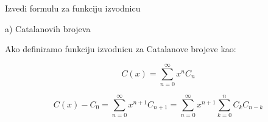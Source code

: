 \documentclass[exam.tex]{subfiles}
\begin{document}
	Izvedi formulu za funkciju izvodnicu
	
	a) Catalanovih brojeva
	
	Ako definiramo funkciju izvodnicu za Catalanove brojeve kao:
	
	\[ C(x) = \sum\limits^\infty_{n=0} x^n C_n \]
	
	\[ C(x) - C_0 = \sum\limits^\infty_{n=0} x^{n + 1} C_{n + 1} = \sum\limits^\infty_{n=0} x^{n + 1} \sum\limits^n_{k=0} C_k C_{n - k} \]
\end{document}

